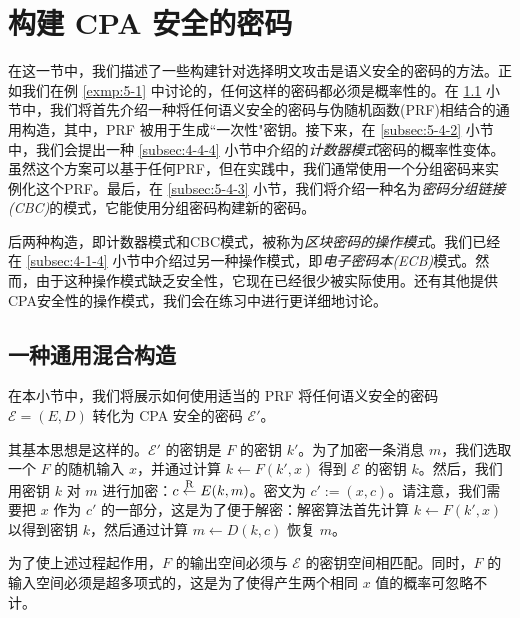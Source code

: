 \section{构建 CPA 安全的密码}\label{sec:5-4}

在这一节中，我们描述了一些构建针对选择明文攻击是语义安全的密码的方法。正如我们在例 \ref{exmp:5-1} 中讨论的，任何这样的密码都必须是概率性的。在 \ref{subsec:5-4-1} 小节中，我们将首先介绍一种将任何语义安全的密码与伪随机函数(PRF)相结合的通用构造，其中，PRF 被用于生成``一次性"密钥。接下来，在 \ref{subsec:5-4-2} 小节中，我们会提出一种 \ref{subsec:4-4-4} 小节中介绍的\emph{计数器模式}密码的概率性变体。虽然这个方案可以基于任何PRF，但在实践中，我们通常使用一个分组密码来实例化这个PRF。最后，在 \ref{subsec:5-4-3} 小节，我们将介绍一种名为\emph{密码分组链接(CBC)}的模式，它能使用分组密码构建新的密码。

后两种构造，即计数器模式和CBC模式，被称为\emph{区块密码的操作模式}。我们已经在 \ref{subsec:4-1-4} 小节中介绍过另一种操作模式，即\emph{电子密码本(ECB)}模式。然而，由于这种操作模式缺乏安全性，它现在已经很少被实际使用。还有其他提供CPA安全性的操作模式，我们会在练习中进行更详细地讨论。


\subsection{一种通用混合构造}\label{subsec:5-4-1}

在本小节中，我们将展示如何使用适当的 PRF 将任何语义安全的密码 $\mathcal{E}=(E,D)$ 转化为 CPA 安全的密码 $\mathcal{E}'$。

其基本思想是这样的。$\mathcal{E}'$ 的密钥是 $F$ 的密钥 $k'$。为了加密一条消息 $m$，我们选取一个 $F$ 的随机输入 $x$，并通过计算 $k\leftarrow F(k',x)$ 得到 $\mathcal{E}$ 的密钥 $k$。然后，我们用密钥 $k$ 对 $m$ 进行加密：$c\overset{\rm R}\leftarrow E(k,m)$。密文为 $c':=(x,c)$。请注意，我们需要把 $x$ 作为 $c'$ 的一部分，这是为了便于解密：解密算法首先计算 $k\leftarrow F(k',x)$ 以得到密钥 $k$，然后通过计算 $m\leftarrow D(k,c)$ 恢复 $m$。

为了使上述过程起作用，$F$ 的输出空间必须与 $\mathcal{E}$ 的密钥空间相匹配。同时，$F$ 的输入空间必须是超多项式的，这是为了使得产生两个相同 $x$  值的概率可忽略不计。

